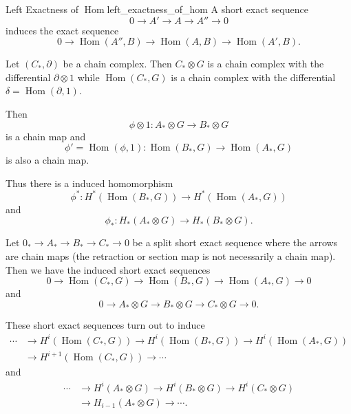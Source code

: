 \documentclass{article}
\begin{document}
\begin{proposition}{Left Exactness of $\operatorname{Hom}$}{left_exactness_of_hom}
    A short exact sequence
    \[ 0 \longrightarrow A' \longrightarrow A \longrightarrow A'' \longrightarrow 0 \]
    induces the exact sequence
    \[ 0 \longrightarrow \operatorname{Hom}(A'',B) \longrightarrow \operatorname{Hom}(A,B) \longrightarrow \operatorname{Hom}(A',B). \]
\end{proposition}

Let $(C_*,\partial)$ be a chain complex.
Then $C_*\otimes G$ is a chain complex with the differential $\partial\otimes 1$ while $\operatorname{Hom}(C_*,G)$ is a chain complex with the differential $\delta = \operatorname{Hom}(\partial,1)$.
\par
Then
\[ \phi\otimes 1: A_* \otimes G \rightarrow B_*\otimes G \]
is a chain map and
\[ \phi'=\operatorname{Hom}(\phi,1):\operatorname{Hom}(B_*,G) \rightarrow \operatorname{Hom}(A_*,G) \]
is also a chain map.
\par
Thus there is a induced homomorphism
\[ \phi^*: H^*(\operatorname{Hom}(B_*,G)) \rightarrow H^*(\operatorname{Hom}(A_*,G)) \]
and
\[ \phi_*: H_*(A_*\otimes G) \rightarrow H_*(B_*\otimes G). \]
\par
Let $0_* \longrightarrow A_* \longrightarrow B_* \longrightarrow C_* \longrightarrow 0$ be a split short exact sequence where the arrows are chain maps (the retraction or section map is not necessarily a chain map).
Then we have the induced short exact sequences
\[ 0 \longrightarrow \operatorname{Hom}(C_*,G) \longrightarrow \operatorname{Hom}(B_*,G) \longrightarrow \operatorname{Hom}(A_*,G) \longrightarrow 0 \]
and
\[ 0 \longrightarrow A_*\otimes G \longrightarrow B_*\otimes G \longrightarrow C_*\otimes G \longrightarrow 0. \]
\par
These short exact sequences turn out to induce
\begin{align*}
    \cdots &\longrightarrow H^i(\operatorname{Hom}(C_*,G)) \longrightarrow H^i(\operatorname{Hom}(B_*,G)) \longrightarrow H^i(\operatorname{Hom}(A_*,G)) \\
    &\longrightarrow H^{i+1}(\operatorname{Hom}(C_*,G)) \longrightarrow \cdots
\end{align*}
and
\begin{align*}
    \cdots &\longrightarrow H^i(A_*\otimes G) \longrightarrow H^i(B_*\otimes G) \longrightarrow H^i(C_*\otimes G) \\
    &\longrightarrow H_{i-1}(A_*\otimes G) \longrightarrow \cdots.
\end{align*}
\end{document}
